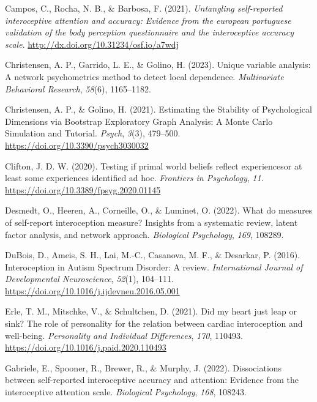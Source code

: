 \documentclass[
  man,
  floatsintext,
  longtable,
  nolmodern,
  notxfonts,
  notimes,
  colorlinks=true,linkcolor=blue,citecolor=blue,urlcolor=blue]{apa7}
\newlength{\cslhangindent}
\newenvironment{CSLReferences}[2] %
 {\begin{list}{}{%
  \setlength{\itemindent}{0pt}
  \setlength{\leftmargin}{0pt}
  \setlength{\parsep}{0pt}
  \ifodd #1
   \setlength{\leftmargin}{\cslhangindent}
   \setlength{\itemindent}{-1\cslhangindent}
  \fi
  \setlength{\itemsep}{#2\baselineskip}}}
 {\end{list}}
\begin{document}
\begin{CSLReferences}{1}{0}
Campos, C., Rocha, N. B., \& Barbosa, F. (2021). \emph{Untangling
self-reported interoceptive attention and accuracy: Evidence from the
european portuguese validation of the body perception questionnaire and
the interoceptive accuracy scale}.
\url{http://dx.doi.org/10.31234/osf.io/a7wdj}

Christensen, A. P., Garrido, L. E., \& Golino, H. (2023). Unique
variable analysis: A network psychometrics method to detect local
dependence. \emph{Multivariate Behavioral Research}, \emph{58}(6),
1165--1182.

Christensen, A. P., \& Golino, H. (2021). Estimating the Stability of
Psychological Dimensions via Bootstrap Exploratory Graph Analysis: A
Monte Carlo Simulation and Tutorial. \emph{Psych}, \emph{3}(3),
479--500. \url{https://doi.org/10.3390/psych3030032}

Clifton, J. D. W. (2020). Testing if primal world beliefs reflect
experiences{\textemdash}or at least some experiences identified ad hoc.
\emph{Frontiers in Psychology}, \emph{11}.
\url{https://doi.org/10.3389/fpsyg.2020.01145}

Desmedt, O., Heeren, A., Corneille, O., \& Luminet, O. (2022). What do
measures of self-report interoception measure? Insights from a
systematic review, latent factor analysis, and network approach.
\emph{Biological Psychology}, \emph{169}, 108289.

DuBois, D., Ameis, S. H., Lai, M.-C., Casanova, M. F., \& Desarkar, P.
(2016). Interoception in Autism Spectrum Disorder: A review.
\emph{International Journal of Developmental Neuroscience},
\emph{52}(1), 104--111.
\url{https://doi.org/10.1016/j.ijdevneu.2016.05.001}

Erle, T. M., Mitschke, V., \& Schultchen, D. (2021). Did my heart just
leap or sink? The role of personality for the relation between cardiac
interoception and well-being. \emph{Personality and Individual
Differences}, \emph{170}, 110493.
\url{https://doi.org/10.1016/j.paid.2020.110493}

Gabriele, E., Spooner, R., Brewer, R., \& Murphy, J. (2022).
Dissociations between self-reported interoceptive accuracy and
attention: Evidence from the interoceptive attention scale.
\emph{Biological Psychology}, \emph{168}, 108243.


\end{CSLReferences}
\end{document}
